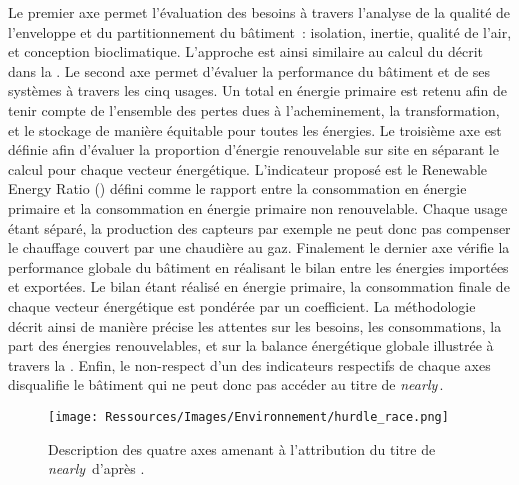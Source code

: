 Le premier axe permet l’évaluation des besoins à travers l’analyse
de la qualité de l’enveloppe et du partitionnement du bâtiment~: isolation, inertie, qualité de l’air,
et conception bioclimatique. L’approche est ainsi similaire au calcul du  décrit dans
la .
Le second axe permet d’évaluer la performance du bâtiment et de ses systèmes à travers les
cinq usages. Un total en énergie primaire est retenu afin de tenir compte de l’ensemble
des pertes dues à l’acheminement, la transformation, et le stockage de manière équitable
pour toutes les énergies.
Le troisième axe est définie afin d’évaluer la proportion d’énergie renouvelable sur site en séparant
le calcul pour chaque vecteur énergétique. L’indicateur proposé est le Renewable Energy Ratio
() défini comme le rapport entre la consommation en énergie primaire et la consommation
en énergie primaire non renouvelable. Chaque usage étant séparé, la production des
capteurs  par exemple ne peut donc pas compenser le chauffage couvert par une chaudière
au gaz.
Finalement le dernier axe vérifie la performance globale du bâtiment en réalisant
le bilan entre les énergies importées et exportées. Le bilan étant réalisé en énergie
primaire, la consommation finale de chaque vecteur énergétique est pondérée par un
coefficient.
La méthodologie décrit ainsi de manière précise les attentes sur les besoins, les
consommations, la part des énergies renouvelables, et sur la balance énergétique globale
illustrée à travers la .
Enfin, le non-respect d’un des indicateurs respectifs de chaque axes disqualifie le bâtiment
qui ne peut donc pas accéder au titre de \textit{nearly}\,.

\begin{figure}
    \centering
    \texttt{[image: Ressources/Images/Environnement/hurdle\_race.png]}
    \caption{Description des quatre axes amenant à l’attribution du titre de
             \textit{nearly}\, d’après \textcite{Zirngibl2014}.}
    \label{fig:attribution_nZEB}
\end{figure}



